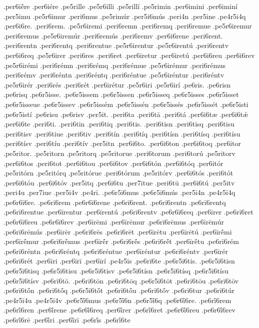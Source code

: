 {.per6iḗre
.per6iére
.pe5rille
.pe5r6illi
.pe5rillí
.pe5rimin
.per6imini
.per6iminí
.per5imu
.pe5r6imur
.peri6mus
.pe5rimúr
.per5i6mús
.peri4n
.per5ine
.pe4r5i4q
.per6i6re.
.peri6rem.
.pe5r6iremi
.peri6remn
.peri6remq
.peri6remue
.pe5r6iremur
.peri6remus
.pe5r6iremúr
.peri6remús
.peri6remv
.per6i6rene
.peri6rent.
.peri6rentn
.peri6rentq
.peri6rentue
.pe5r6irentur
.pe5r6irentú
.peri6rentv
.per6i6req
.pe5r6irer
.peri6res
.peri6ret
.per6iretur
.per6iretú
.per6i6reu
.per6i6rev
.pe5r6irémi
.peri6rémn
.peri6rémq
.peri6rémue
.pe5r6irémur
.peri6rémus
.peri6rémv
.peri6réntn
.peri6réntq
.peri6réntue
.pe5r6iréntur
.peri6réntv
.pe5r6irér
.peri6rés
.peri6rét
.per6irétur
.pe5r6iri
.pe5r6irí
.pe6ris.
.pe6risn
.pe6risq
.pe6r5isse.
.pe6r5issem
.pe6r5issen
.pe6r5isseq
.pe6r5isses
.pe6r5isset
.pe6r5isseue
.pe6r5issev
.pe6r5issém
.pe6r5issén
.pe6r5issés
.pe6r5issét
.pe6r5isti
.pe6r5istí
.pe6risu
.pe6risv
.per5it.
.peri6ta
.peri6tā
.peri6tá
.per6i6tæ
.per6i6tǽ
.per6i6te
.peri6ti.
.peri6tin
.peri6tiq
.peri6tis.
.peri6tisn
.peri6tisq
.peri6tisu
.peri6tisv
.peri6tiue
.peri6tiv
.peri6tín
.peri6tíq
.peri6tísn
.peri6tísq
.peri6tísu
.peri6tísv
.peri6tíu
.peri6tív
.per5itn
.per6i6to.
.per6i6ton
.per6i6toq
.per6itor
.pe5ritor.
.pe5ritorn
.pe5ritorq
.pe5ritorue
.peri6torum
.peri6torú
.pe5ritorv
.per6i6tos
.peri6tot
.per6i6tou
.per6i6tov
.per6i6tón
.per6i6tóq
.per6itór
.pe5ritórn
.pe5ritórq
.pe5ritórue
.peri6tórum
.pe5ritórv
.per6i6tós
.peri6tót
.per6i6tóu
.per6i6tóv
.per5itq
.per6i6tu
.per7itue
.peri6tū
.per6i6tú
.per5itv
.peri4u
.per7iue
.per5i4v
.pe4rī.
.pe6r5ī6mus
.pe6r5ī6mús
.per5ī4n
.pe4r5ī4q
.pe6r6ī6re.
.pe6rī6rem
.pe6r6ī6rene
.pe6rī6rent.
.pe6rī6rentn
.pe6rī6rentq
.pe6rī6rentue
.per6īrentur
.per6īrentú
.pe6rī6rentv
.pe6r6ī6req
.per6īrer
.pe6rī6ret
.pe6r6ī6reu
.pe6r6ī6rev
.per6īrēmi
.per6īrēmur
.pe6rī6rēmus
.per6īrēmúr
.pe6rī6rēmús
.per6īrēr
.pe6rī6rēs
.pe6rī6rēt
.per6īrētu
.per6īrētú
.per6īrḗmi
.per6īrḗmur
.pe6rī6rḗmus
.per6īrḗr
.pe6rī6rḗs
.pe6rī6rḗt
.per6īrḗtu
.pe6rī6rém
.pe6rī6réntn
.pe6rī6réntq
.pe6rī6réntue
.per6īréntur
.pe6rī6réntv
.per6īrér
.pe6rī6rét
.per6īri
.per6īrī
.per6īrí
.pe4r5īs
.pe6rī6te
.pe6r5ī6tis.
.pe6r5ī6tisn
.pe6r5ī6tisq
.pe6r5ī6tisu
.pe6r5ī6tisv
.pe6r5ī6tísn
.pe6r5ī6tísq
.pe6r5ī6tísu
.pe6r5ī6tísv
.pe6rī6tō.
.pe6rī6tōn
.pe6rī6tōq
.pe6r5ī6tōt
.pe6rī6tōu
.pe6rī6tōv
.pe6rī6tṓn
.pe6rī6tṓq
.pe6r5ī6tṓt
.pe6rī6tṓu
.pe6rī6tṓv
.pe6rī6tur
.pe6rī6túr
.pe4r5ī4u
.pe4r5ī4v
.pe6r5ī́6mus
.pe6r5ī́6n
.pe6r5ī́6q
.pe6r6ī́6re.
.pe6rī́6rem
.pe6rī́6ren
.per6ī́rene
.pe6r6ī́6req
.per6ī́rer
.pe6rī́6ret
.pe6r6ī́6reu
.pe6r6ī́6rev
.pe6rī́6rē
.per6ī́ri
.per6ī́rī
.pe6rī́s
.pe6rī́6te
}
